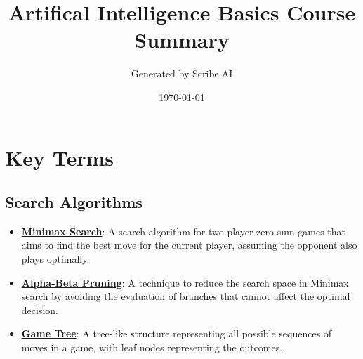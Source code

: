 \documentclass{article}%
\title{Artifical Intelligence Basics Course Summary}%
\author{Generated by Scribe.AI}%
\date{\today}%
\begin{document}
%
\normalsize%
\maketitle%
\section{Key Terms}%
\label{sec:KeyTerms}%
\subsection{Search Algorithms}%
\label{subsec:SearchAlgorithms}%
\begin{itemize}[leftmargin=*]%
\item \href{https://purdue.brightspace.com/d2l/common/assets/pdfjs-d2l-dist/1.0.14-legacy/web/viewer.html?file=%2Fcontent%2Fenforced%2F1095467-wl.202510.CS.24300.001%2F02L2-Intro.pdf%3Fou%3D1095467&lang=en-us&container=d2l-fileviewer-rendered-pdf&fullscreen=d2l-fileviewer-rendered-pdf-dialog&height=667#page=22}{\textbf{Minimax Search}}: A search algorithm for two-player zero-sum games that aims to find the best move for the current player, assuming the opponent also plays optimally.%
\item \href{https://purdue.brightspace.com/d2l/common/assets/pdfjs-d2l-dist/1.0.14-legacy/web/viewer.html?file=%2Fcontent%2Fenforced%2F1095467-wl.202510.CS.24300.001%2F02L2-Intro.pdf%3Fou%3D1095467&lang=en-us&container=d2l-fileviewer-rendered-pdf&fullscreen=d2l-fileviewer-rendered-pdf-dialog&height=667#page=23}{\textbf{Alpha-Beta Pruning}}: A technique to reduce the search space in Minimax search by avoiding the evaluation of branches that cannot affect the optimal decision.%
\item \href{https://purdue.brightspace.com/d2l/common/assets/pdfjs-d2l-dist/1.0.14-legacy/web/viewer.html?file=%2Fcontent%2Fenforced%2F1095467-wl.202510.CS.24300.001%2F02L2-Intro.pdf%3Fou%3D1095467&lang=en-us&container=d2l-fileviewer-rendered-pdf&fullscreen=d2l-fileviewer-rendered-pdf-dialog&height=667#page=11}{\textbf{Game Tree}}: A tree-like structure representing all possible sequences of moves in a game, with leaf nodes representing the outcomes.%
\end{itemize}

%
\end{document}
